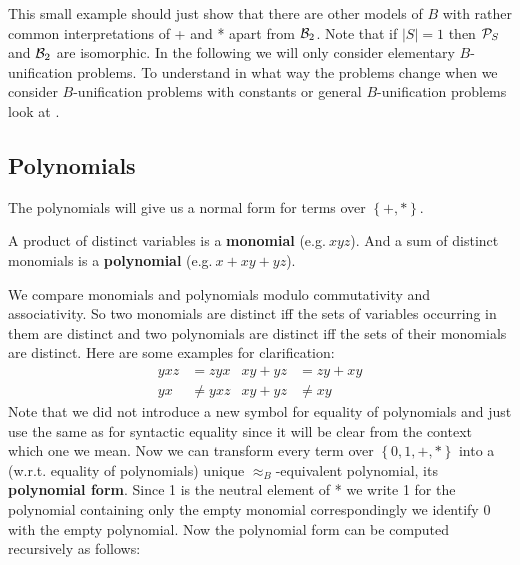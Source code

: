 	This small example should just show that there are other models of $B$ with rather common interpretations of + and * apart from ${\mathcal{B}_2}$. Note that if $|S|=1$ then ${\mathcal{P}_S}$ and ${\mathcal{B}_2}$ are isomorphic.
	In the following we will only consider elementary $B$-unification problems. To understand in what way the problems change when we consider $B$-unification problems with constants or general $B$-unification problems look at \cite{cmplxBU}.
	\subsection{Polynomials}
	The polynomials will give us a normal form for terms over $\left\lbrace +,*\right\rbrace $.
	\begin{definition}
		A product of distinct variables is a \textbf{monomial} (e.g.$\ xyz$). And a sum of distinct monomials is a \textbf{polynomial} (e.g.$\ x+xy+yz$).
	\end{definition}
	We compare monomials and polynomials modulo commutativity and associativity. So two monomials are distinct iff the sets of variables occurring in them are distinct and two polynomials are distinct iff the sets of their monomials are distinct.
	Here are some examples for clarification:
	\begin{align*}
		yxz & =zyx     & xy+yz & =zy+xy  \\
		yx  & \neq yxz & xy+yz & \neq xy 
	\end{align*}
	Note that we did not introduce a new symbol for equality of polynomials and just use the same as for syntactic equality since it will be clear from the context which one we mean. Now we can transform every term over $\left\lbrace 0,1,+,*\right\rbrace$ 
	into a (w.r.t. equality of polynomials) unique $\approx_B$-equivalent polynomial, its \textbf{polynomial form}. Since 1 is the neutral element of * we write 1 for the polynomial containing only the empty monomial correspondingly we identify 0 with the empty polynomial. Now the polynomial form can be computed recursively as follows:
